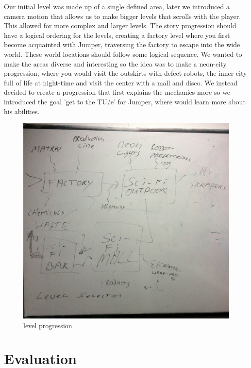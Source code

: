 \documentclass[a4paper,twoside,12pt]{article}
\begin{document}
Our initial level was made up of a single defined area, later we introduced a camera motion that allows us to make bigger levels that scrolls with the player. This allowed for more complex and larger levels.
The story progression should have a logical ordering for the levels, creating a factory level where you first become acquainted with Jumper, traversing the factory to escape into the wide world. These world locations should follow some logical sequence. We wanted to make the areas diverse and interesting so the idea was to make a neon-city progression, where you would visit the outskirts with defect robots, the inner city full of life at night-time and visit the center with a mall and disco. We instead decided to create a progression that first explains the mechanics more so we introduced the goal 'get to the TU/e' for Jumper, where would learn more about his abilities.
\begin{figure}[h]
\includegraphics[scale=0.2]{locations}
\caption{level progression}
\end{figure}

\section{Evaluation}
\end{document}
